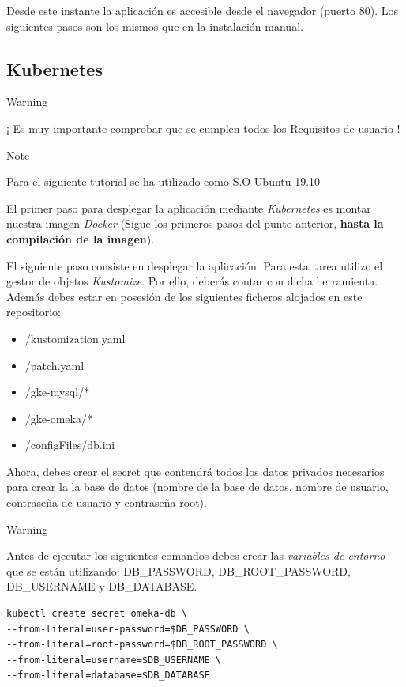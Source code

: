 \documentclass[
]{article}
\providecommand{\tightlist}{%
  \setlength{\itemsep}{0pt}\setlength{\parskip}{0pt}}
\begin{document}
Desde este instante la aplicación es accesible desde el navegador
(puerto 80). Los siguientes pasos son los mismos que en la
\href{Manual}{instalación manual}.

\hypertarget{kubernetes-1}{%
\subsection{Kubernetes}\label{kubernetes-1}}

Warning

¡ Es muy importante comprobar que se cumplen todos los
\protect\hyperlink{requisitos-de-usuario}{Requisitos de usuario} !

Note

Para el siguiente tutorial se ha utilizado como S.O Ubuntu 19.10

El primer paso para desplegar la aplicación mediante \emph{Kubernetes}
es montar nuestra imagen \emph{Docker} (Sigue los primeros pasos del
punto anterior, \textbf{hasta la compilación de la imagen}).

El siguiente paso consiste en desplegar la aplicación. Para esta tarea
utilizo el gestor de objetos \emph{Kustomize}. Por ello, deberás contar
con dicha herramienta. Además debes estar en posesión de los siguientes
ficheros alojados en este repositorio:

\begin{itemize}
\tightlist
\item
  /kustomization.yaml
\item
  /patch.yaml
\item
  /gke-mysql/*
\item
  /gke-omeka/*
\item
  /configFiles/db.ini
\end{itemize}

Ahora, debes crear el {secret} que contendrá todos los datos privados
necesarios para crear la la base de datos (nombre de la base de datos,
nombre de usuario, contraseña de usuario y contraseña root).

Warning

Antes de ejecutar los siguientes comandos debes crear las
\emph{variables de entorno} que se están utilizando: DB\_PASSWORD,
DB\_ROOT\_PASSWORD, DB\_USERNAME y DB\_DATABASE.

\begin{verbatim}
kubectl create secret omeka-db \
--from-literal=user-password=$DB_PASSWORD \
--from-literal=root-password=$DB_ROOT_PASSWORD \
--from-literal=username=$DB_USERNAME \
--from-literal=database=$DB_DATABASE
\end{verbatim}
\end{document}
